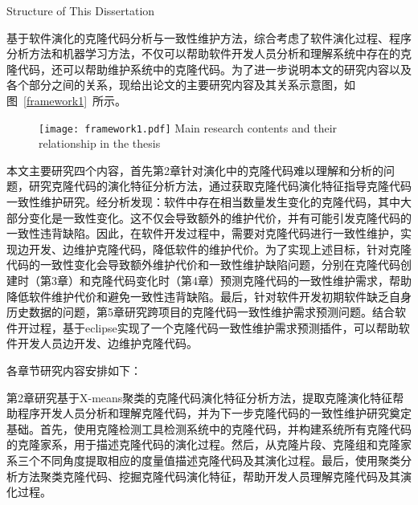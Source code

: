 {Structure of This Dissertation}

基于软件演化的克隆代码分析与一致性维护方法，综合考虑了软件演化过程、程序分析方法和机器学习方法，不仅可以帮助软件开发人员分析和理解系统中存在的克隆代码，还可以帮助维护系统中的克隆代码。为了进一步说明本文的研究内容以及各个部分之间的关系，现给出论文的主要研究内容及其关系示意图，如图~\ref{framework1}~所示。

\begin{figure}[htbp]
\centering
\texttt{[image: framework1.pdf]}
{Main research contents and their relationship in the thesis}
\vspace{-1em}
\end{figure}

本文主要研究四个内容，首先第2章针对演化中的克隆代码难以理解和分析的问题，研究克隆代码的演化特征分析方法，通过获取克隆代码演化特征指导克隆代码一致性维护研究。经分析发现：软件中存在相当数量发生变化的克隆代码，其中大部分变化是一致性变化。这不仅会导致额外的维护代价，并有可能引发克隆代码的一致性违背缺陷。因此，在软件开发过程中，需要对克隆代码进行一致性维护，实现边开发、边维护克隆代码，降低软件的维护代价。为了实现上述目标，针对克隆代码的一致性变化会导致额外维护代价和一致性维护缺陷问题，分别在克隆代码创建时（第3章）和克隆代码变化时（第4章）预测克隆代码的一致性维护需求，帮助降低软件维护代价和避免一致性违背缺陷。最后，针对软件开发初期软件缺乏自身历史数据的问题，第5章研究跨项目的克隆代码一致性维护需求预测问题。结合软件开过程，基于eclipse实现了一个克隆代码一致性维护需求预测插件，可以帮助软件开发人员边开发、边维护克隆代码。




各章节研究内容安排如下：

第2章研究基于X-means聚类的克隆代码演化特征分析方法，提取克隆演化特征帮助程序开发人员分析和理解克隆代码，并为下一步克隆代码的一致性维护研究奠定基础。首先，使用克隆检测工具检测系统中的克隆代码，并构建系统所有克隆代码的克隆家系，用于描述克隆代码的演化过程。然后，从克隆片段、克隆组和克隆家系三个不同角度提取相应的度量值描述克隆代码及其演化过程。最后，使用聚类分析方法聚类克隆代码、挖掘克隆代码演化特征，帮助开发人员理解克隆代码及其演化过程。

